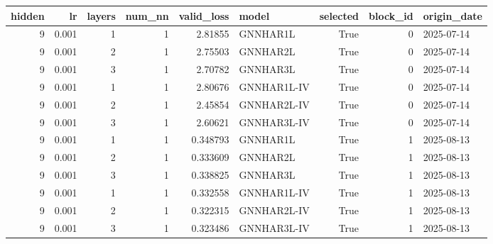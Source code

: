 \begin{tabular}{rrrrrlrrl}
\toprule
hidden & lr & layers & num_nn & valid_loss & model & selected & block_id & origin_date \\
\midrule
9 & 0.001 & 1 & 1 & 2.81855 & GNNHAR1L & True & 0 & 2025-07-14 \\
9 & 0.001 & 2 & 1 & 2.75503 & GNNHAR2L & True & 0 & 2025-07-14 \\
9 & 0.001 & 3 & 1 & 2.70782 & GNNHAR3L & True & 0 & 2025-07-14 \\
9 & 0.001 & 1 & 1 & 2.80676 & GNNHAR1L-IV & True & 0 & 2025-07-14 \\
9 & 0.001 & 2 & 1 & 2.45854 & GNNHAR2L-IV & True & 0 & 2025-07-14 \\
9 & 0.001 & 3 & 1 & 2.60621 & GNNHAR3L-IV & True & 0 & 2025-07-14 \\
9 & 0.001 & 1 & 1 & 0.348793 & GNNHAR1L & True & 1 & 2025-08-13 \\
9 & 0.001 & 2 & 1 & 0.333609 & GNNHAR2L & True & 1 & 2025-08-13 \\
9 & 0.001 & 3 & 1 & 0.338825 & GNNHAR3L & True & 1 & 2025-08-13 \\
9 & 0.001 & 1 & 1 & 0.332558 & GNNHAR1L-IV & True & 1 & 2025-08-13 \\
9 & 0.001 & 2 & 1 & 0.322315 & GNNHAR2L-IV & True & 1 & 2025-08-13 \\
9 & 0.001 & 3 & 1 & 0.323486 & GNNHAR3L-IV & True & 1 & 2025-08-13 \\
\bottomrule
\end{tabular}
